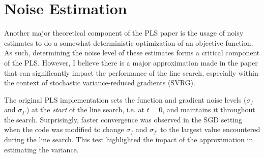 \documentclass{article}
\begin{document}
\section{Noise Estimation}
Another major theoretical component of the PLS paper is the usage of noisy estimates to do a somewhat deterministic optimization of an objective function. As such, determining the noise level of these estimates forms a critical component of the PLS. However, I believe there is a major approximation made in the paper that can significantly impact the performance of the line search, especially within the context of stochastic variance-reduced gradients (SVRG). 

The original PLS implementation sets the function and gradient noise levels ($\sigma_f$ and $\sigma_{f'}$) at the \emph{start} of the line search, i.e. at $t=0$, and maintains it throughout the search. Surprisingly, faster convergence was observed in the SGD setting when the code was modified to change $\sigma_f$ and $\sigma_{f'}$ to the largest value encountered during the line search. This test highlighted the impact of the approximation in estimating the variance. 
\end{document}
